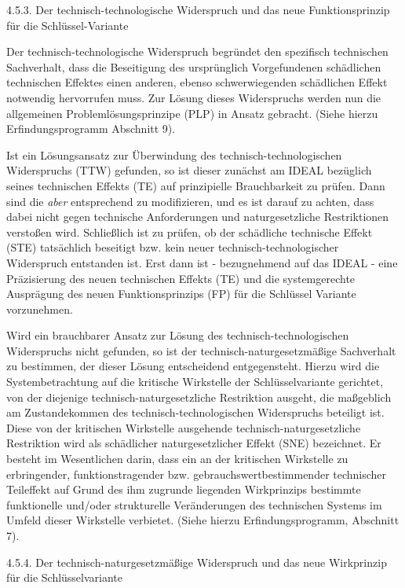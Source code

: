 \documentclass[12pt,a4paper]{article}
\begin{document}
4.5.3. Der technisch-technologische Widerspruch und das neue Funktionsprinzip für die Schlüssel-Variante

Der technisch-technologische Widerspruch begründet den spezifisch technischen Sachverhalt, dass die Beseitigung des ursprünglich Vorgefundenen schädlichen technischen Effektes einen anderen, ebenso schwerwiegenden schädlichen Effekt notwendig hervorrufen muss. Zur Lösung dieses Widerspruchs werden nun die allgemeinen Problemlösungsprinzipe (PLP) in Ansatz gebracht. (Siehe hierzu Erfindungsprogramm Abschnitt 9).

Ist ein Lösungsansatz zur Überwindung des technisch-technologischen Widerspruchs (TTW) gefunden, so ist dieser zunächst am IDEAL bezüglich seines technischen Effekts (TE) auf prinzipielle Brauchbarkeit zu prüfen. Dann sind die \emph{aber} entsprechend zu modifizieren, und es ist darauf zu achten, dass dabei nicht gegen technische Anforderungen und naturgesetzliche Restriktionen ver­stoßen wird. Schließlich ist zu prüfen, ob der schädliche technische Effekt (STE) tatsächlich beseitigt bzw. kein neuer technisch-technologischer Widerspruch entstanden ist. Erst dann ist - bezugnehmend auf das IDEAL - eine Präzisierung des neuen tech­nischen Effekts (TE) und die systemgerechte Ausprägung des neuen Funktionsprinzips (FP) für die Schlüssel Variante vorzunehmen.

Wird ein brauchbarer Ansatz zur Lösung des technisch-technolo­gischen Widerspruchs nicht gefunden, so ist der technisch-naturgesetzmäßige Sachverhalt zu bestimmen, der dieser Lösung ent­scheidend entgegensteht. Hierzu wird die Systembetrachtung auf die kritische Wirkstelle der Schlüsselvariante gerichtet, von der diejenige technisch-naturgesetzliche Restriktion ausgeht, die maßgeblich am Zustandekommen des technisch-technologischen Widerspruchs beteiligt ist. Diese von der kritischen Wirkstelle aus­gehende technisch-naturgesetzliche Restriktion wird als schädlicher naturgesetzlicher Effekt (SNE) bezeichnet. Er besteht im Wesentlichen darin, dass ein an der kritischen Wirkstelle zu erbringender, funktionstragender bzw. gebrauchswertbestimmender technischer Teileffekt auf Grund des ihm zugrunde liegenden Wirkprinzips bestimmte funktionelle und/oder strukturelle Veränderungen des technischen Systems im Umfeld dieser Wirkstelle verbietet. (Siehe hierzu Erfindungsprogramm, Abschnitt 7).


4.5.4.  Der technisch-naturgesetzmäßige Widerspruch und das neue Wirkprinzip für die Schlüsselvariante
\end{document}
